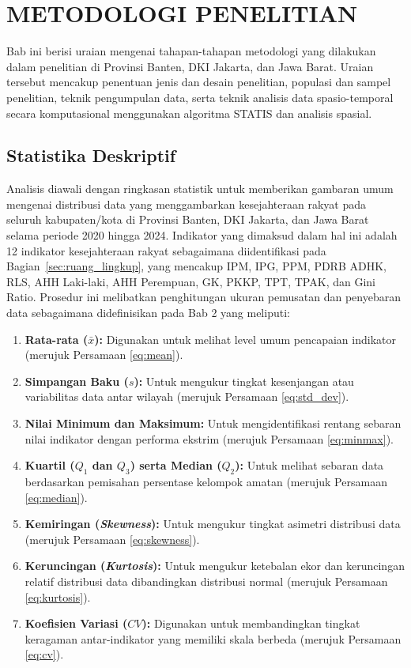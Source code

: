 \chapter{\normalsize METODOLOGI PENELITIAN}
\raggedbottom

Bab ini berisi uraian mengenai tahapan-tahapan metodologi yang dilakukan dalam penelitian di Provinsi Banten, DKI Jakarta, dan Jawa Barat. Uraian tersebut mencakup penentuan jenis dan desain penelitian, populasi dan sampel penelitian, teknik pengumpulan data, serta teknik analisis data spasio-temporal secara komputasional menggunakan algoritma STATIS dan analisis spasial.

\section{\normalsize Statistika Deskriptif}
Analisis diawali dengan ringkasan statistik untuk memberikan gambaran umum mengenai distribusi data yang menggambarkan kesejahteraan rakyat pada seluruh kabupaten/kota di Provinsi Banten, DKI Jakarta, dan Jawa Barat selama periode 2020 hingga 2024. Indikator yang dimaksud dalam hal ini adalah 12 indikator kesejahteraan rakyat sebagaimana diidentifikasi pada Bagian~\ref{sec:ruang_lingkup}, yang mencakup IPM, IPG, PPM, PDRB ADHK, RLS, AHH Laki-laki, AHH Perempuan, GK, PKKP, TPT, TPAK, dan Gini Ratio. Prosedur ini melibatkan penghitungan ukuran pemusatan dan penyebaran data sebagaimana didefinisikan pada Bab 2 yang meliputi:
\begin{enumerate}
    \item \textbf{Rata-rata ($\bar{x}$):} Digunakan untuk melihat level umum pencapaian indikator (merujuk Persamaan \ref{eq:mean}).
    \item \textbf{Simpangan Baku ($s$):} Untuk mengukur tingkat kesenjangan atau variabilitas data antar wilayah (merujuk Persamaan \ref{eq:std_dev}).
    \item \textbf{Nilai Minimum dan Maksimum:} Untuk mengidentifikasi rentang sebaran nilai indikator dengan performa ekstrim (merujuk Persamaan \ref{eq:minmax}).
    \item \textbf{Kuartil ($Q_1$ dan $Q_3$) serta Median ($Q_2$):} Untuk melihat sebaran data berdasarkan pemisahan persentase kelompok amatan (merujuk Persamaan \ref{eq:median}).
    \item \textbf{Kemiringan (\textit{Skewness}):} Untuk mengukur tingkat asimetri distribusi data (merujuk Persamaan \ref{eq:skewness}).
    \item \textbf{Keruncingan (\textit{Kurtosis}):} Untuk mengukur ketebalan ekor dan keruncingan relatif distribusi data dibandingkan distribusi normal (merujuk Persamaan \ref{eq:kurtosis}).
    \item \textbf{Koefisien Variasi ($CV$):} Digunakan untuk membandingkan tingkat keragaman antar-indikator yang memiliki skala berbeda (merujuk Persamaan \ref{eq:cv}).
\end{enumerate}

